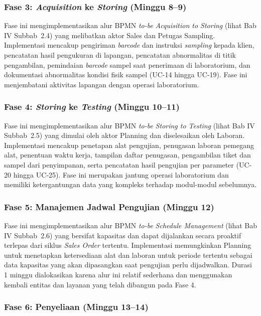 \subsubsection{Fase 3: \textit{Acquisition} ke \textit{Storing} (Minggu 8–9)}

Fase ini mengimplementasikan alur BPMN \textit{to-be} \textit{Acquisition to Storing} (lihat Bab IV Subbab~2.4) yang melibatkan aktor Sales dan Petugas Sampling. Implementasi mencakup pengiriman \textit{barcode} dan instruksi \textit{sampling} kepada klien, pencatatan hasil pengukuran di lapangan, pencatatan abnormalitas di titik pengambilan, pemindaian \textit{barcode} sampel saat penerimaan di laboratorium, dan dokumentasi abnormalitas kondisi fisik sampel (UC-14 hingga UC-19). Fase ini menjembatani aktivitas lapangan dengan operasi laboratorium.

\subsubsection{Fase 4: \textit{Storing} ke \textit{Testing} (Minggu 10–11)}

Fase ini mengimplementasikan alur BPMN \textit{to-be} \textit{Storing to Testing} (lihat Bab IV Subbab~2.5) yang dimulai oleh aktor Planning dan diselesaikan oleh Laboran. Implementasi mencakup penetapan alat pengujian, penugasan laboran pemegang alat, penentuan waktu kerja, tampilan daftar penugasan, pengambilan tiket dan sampel dari penyimpanan, serta pencatatan hasil pengujian per parameter (UC-20 hingga UC-25). Fase ini merupakan jantung operasi laboratorium dan memiliki ketergantungan data yang kompleks terhadap modul-modul sebelumnya.

\subsubsection{Fase 5: Manajemen Jadwal Pengujian (Minggu 12)}

Fase ini mengimplementasikan alur BPMN \textit{to-be} \textit{Schedule Management} (lihat Bab IV Subbab~2.6) yang bersifat kapasitas dan dapat dijalankan secara proaktif terlepas dari siklus \textit{Sales Order} tertentu. Implementasi memungkinkan Planning untuk menetapkan ketersediaan alat dan laboran untuk periode tertentu sebagai data kapasitas yang akan dipasangkan saat pengujian perlu dijadwalkan. Durasi 1 minggu dialokasikan karena alur ini relatif sederhana dan menggunakan kembali entitas dan layanan yang telah dibangun pada Fase 4.

\subsubsection{Fase 6: Penyeliaan (Minggu 13–14)}

